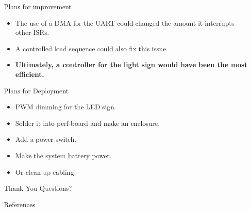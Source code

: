 \documentclass[10pt]{beamer}
\begin{document}
\begin{frame}{Plans for improvement}
  \Large
  \begin{itemize}
    \item The use of a DMA for the UART could changed the amount it interrupts other ISRs.
    \item A controlled load sequence could also fix this issue.
    \item \textbf{Ultimately, a controller for the light sign would have been the most efficient.}
  \end{itemize}
\end{frame}

\begin{frame}{Plans for Deployment}
  \Large
  \begin{itemize}
    \item PWM dimming for the LED sign.
    \item Solder it into perf-board and make an enclosure.
    \item Add a power switch.
    \item Make the system battery power.
    \item Or clean up cabling.
  \end{itemize}
\end{frame}

\begin{frame}{Thank You}
  \Huge Questions?
\end{frame}

\begin{frame}{References}
  \printbibliography{}
\end{frame}
\end{document}
